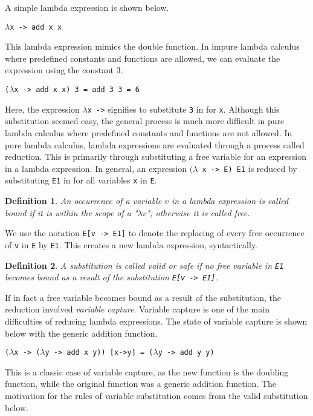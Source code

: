 \documentclass[11pt]{article}
\newtheorem{definition}{Definition}
\begin{document}
A simple lambda expression is shown below.


\hspace{2cm}\texttt{$\lambda$x -> add x x}


This lambda expression mimics the double function. In impure lambda calculus where predefined constants and functions are allowed, we can evaluate the expression using the constant 3.

\hspace{2cm}\texttt{($\lambda$x -> add x x) 3 = add 3 3 = 6}

Here, the expression \texttt{$\lambda$x ->} signifies to substitute \texttt{3} in for \texttt{x}. Although this substitution seemed easy, the general process is much more difficult in pure lambda calculus where predefined constants and functions are not allowed. In pure lambda calculus, lambda expressions are evaluated through a process called reduction. This is primarily through substituting a free variable for an expression in a lambda expression.  In general, an expression \texttt{$(\lambda$ x -> E) E1} is reduced by substituting \texttt{E1} in for all variables \texttt{x} in \texttt{E}. 

\begin{definition}
An occurrence of a variable $v$ in a lambda expression is called bound if it is within the scope of a "$\lambda v$"; otherwise it is called free.
\end{definition}

We use the notation \texttt{E[v -> E1]} to denote the replacing of every free occurrence of \texttt{v} in \texttt{E} by \texttt{E1}. This creates a new lambda expression, syntactically.

\begin{definition}
A substitution is called valid or safe if no free variable in \emph{\texttt{E1}} becomes bound as a result of the substitution \emph{\texttt{E[v -> E1]}}.
\end{definition}

If in fact a free variable becomes bound as a result of the substitution, the reduction involved \emph{variable capture}. Variable capture is one of the main difficulties of reducing lambda expressions. The state of variable capture is shown below with the generic addition function. 

\hspace{2cm}\texttt{($\lambda$x -> ($\lambda$y -> add x y)) [x->y] = ($\lambda$y -> add y y)}

This is a classic case of variable capture, as the new function is the doubling function, while the original function was a generic addition function. The motivation for the rules of variable substitution comes from the valid substitution below. 
\end{document}
